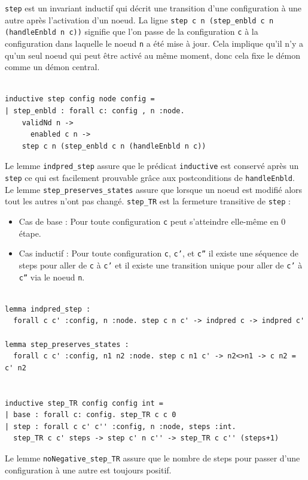 \documentclass[11pt]{article}
\begin{document}
\texttt{step} est un invariant inductif qui décrit une transition d'une configuration à une autre après l'activation d'un noeud.
La ligne \texttt{step c n (step\_enbld c n (handleEnbld n c))} signifie que l'on passe de la configuration \texttt{c} à la configuration dans laquelle le noeud \texttt{n} a été mise à jour. 
Cela implique qu'il n'y a qu'un seul noeud qui peut être activé au même moment, donc cela fixe le démon comme un démon central. 

\lstset{language=why3,label= ,caption= ,captionpos=b,numbers=none}
\begin{lstlisting}

inductive step config node config =
| step_enbld : forall c: config , n :node.
    validNd n ->
      enabled c n ->
	step c n (step_enbld c n (handleEnbld n c))

\end{lstlisting}
Le lemme \texttt{indpred\_step} assure que le prédicat \texttt{inductive} est conservé après un \texttt{step} ce qui est facilement prouvable grâce aux postconditions de \texttt{handleEnbld}.
Le lemme \texttt{step\_preserves\_states} assure que lorsque un noeud est modifié alors tout les autres n'ont pas changé. 
\texttt{step\_TR} est la fermeture transitive de \texttt{step} : 
\begin{itemize}
\item Cas de base : Pour toute configuration \texttt{c} peut s'atteindre elle-même en 0 étape.
\item Cas inductif : Pour toute configuration \texttt{c}, \texttt{c'}, et \texttt{c''} il existe une séquence de steps pour aller de \texttt{c} à \texttt{c'} et il existe une transition unique pour aller de \texttt{c'} à \texttt{c''} via le noeud \texttt{n}.
\end{itemize}
\lstset{language=why3,label= ,caption= ,captionpos=b,numbers=none}
\begin{lstlisting}

lemma indpred_step :
  forall c c' :config, n :node. step c n c' -> indpred c -> indpred c'

lemma step_preserves_states :
  forall c c' :config, n1 n2 :node. step c n1 c' -> n2<>n1 -> c n2 = c' n2


inductive step_TR config config int =
| base : forall c: config. step_TR c c 0
| step : forall c c' c'' :config, n :node, steps :int.
  step_TR c c' steps -> step c' n c'' -> step_TR c c'' (steps+1)

\end{lstlisting}
Le lemme \texttt{noNegative\_step\_TR} assure que le nombre de steps pour passer d'une configuration à une autre est toujours positif.
\end{document}
